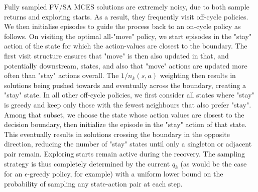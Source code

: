 \documentclass{article}
\begin{document}
Fully sampled FV/SA MCES solutions are extremely noisy, due to both sample returns and exploring starts.
As a result, they frequently visit off-cycle policies.
We then initialise episodes to 
guide the process back to an on-cycle policy as follows.
On visiting the optimal all-"move" policy,
we start episodes in the "stay" action of the state for which the action-values are closest to the boundary.
The first visit structure ensures that "move" is then also updated in that, and potentially downstream, states, 
and also that "move" actions are updated more often than "stay" actions overall. The $1/n_k(s,a)$ weighting then results in solutions being pushed towards and eventually across the boundary, creating a "stay" state.
% 
In all other off-cycle policies,
we first consider all states where "stay" is greedy and keep only those with the fewest neighbours that also prefer "stay". Among that subset, we choose the state whose action values are closest to the decision boundary, then initialize the episode in the "stay" action of that state.
This eventually results in solutions crossing the boundary in the opposite direction, reducing the number of "stay" states until only a singleton or adjacent pair remain.   
Exploring starts remain active during the recovery.
The sampling strategy is thus completely determined by the current $q_k$ (as would be the case for an $\epsilon$-greedy policy, for example) with a uniform lower bound on the probability of sampling any state-action pair at each step.
\end{document}
